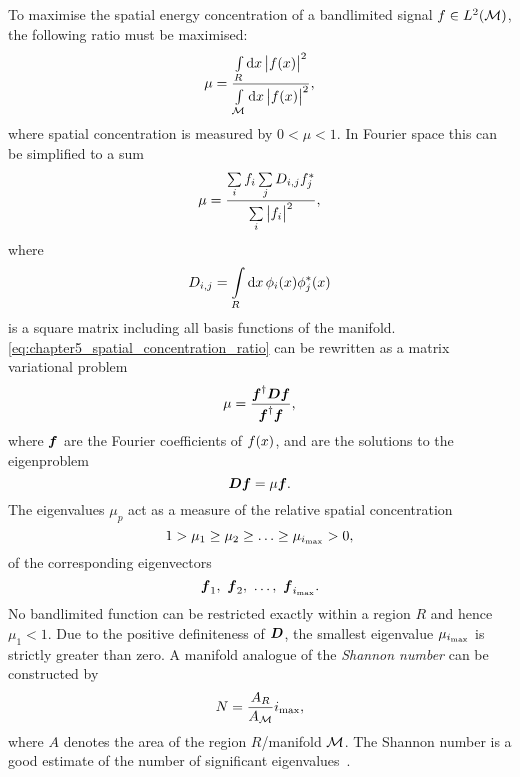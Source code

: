 To maximise the spatial energy concentration of a bandlimited signal \(f \in L^{2}(\mathcal{M})\), the following ratio must be maximised:
%
\begin{equation}
	\mu
	= \frac{\int\limits_{R} \dd{x} \big\lvert f(x)\big\rvert^{2}}{\int\limits_{\mathcal{M}} \dd{x} \big\lvert f(x)\big\rvert^{2}},
\end{equation}
%
where spatial concentration is measured by \(0 < \mu < 1\).
In Fourier space this can be simplified to a sum
%
\begin{equation}\label{eq:chapter5_spatial_concentration_ratio}
	\mu
	= \frac{\sum\limits_{i} f_{i} \sum\limits_{j} D_{i,j} f_{j}^{\ast}}{\sum\limits_{i} \big\lvert f_{i}\big\rvert^{2}},
\end{equation}
%
where
%
\begin{equation}
	D_{i,j}
	= \int\limits_{R} \dd{x} \phi_{i}(x) \phi_{j}^{\ast}(x)
\end{equation}
%
is a square matrix including all basis functions of the manifold.
\cref{eq:chapter5_spatial_concentration_ratio} can be rewritten as a matrix variational problem
%
\begin{equation}
	\mu
	= \frac{\vb*{f}^{\dagger} \vb*{D} \vb*{f}}{\vb*{f}^{\dagger} \vb*{f}},
\end{equation}
%
where \(\vb*{f}\) are the Fourier coefficients of \(f(x)\), and are the solutions to the eigenproblem
%
\begin{equation}\label{eq:chapter5_eigenproblem}
	\vb*{D}\vb*{f}
	= \mu \vb*{f}.
\end{equation}
%
The eigenvalues \(\mu_{p}\) act as a measure of the relative spatial concentration
%
\begin{equation}
	1 > \mu_{1} \geq \mu_{2} \geq \ldots \geq \mu_{\imax} > 0, %
\end{equation}
%
of the corresponding eigenvectors
%
\begin{equation}
	\vb*{f}_{1},\ \vb*{f}_{2},\ \ldots,\ \vb*{f}_{i_{\text{max}}}.
\end{equation}
%
No bandlimited function can be restricted exactly within a region \(R\) and hence \(\mu_{1}<1\).
Due to the positive definiteness of \(\vb*{D}\), the smallest eigenvalue \(\mu_{i_{\text{max}}}\) is strictly greater than zero.
A manifold analogue of the \emph{Shannon number} can be constructed by
%
\begin{equation}\label{eq:chapter5_shannon}
	N
	= \frac{A_{R}}{A_{\mathcal{M}}} i_{\text{max}},
\end{equation}
%
where \(A\) denotes the area of the region \(R\)/manifold \(\mathcal{M}{}\).
The Shannon number is a good estimate of the number of significant eigenvalues~\cite{Percival1993}.

